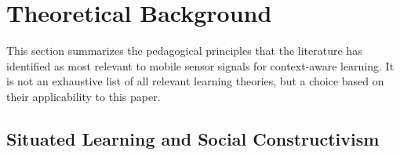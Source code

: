 \documentclass[runningheads]{llncs}
\begin{document}
\section{Theoretical Background}

This section summarizes the pedagogical principles that the literature has identified as most relevant to mobile sensor signals for context-aware learning. It is not an exhaustive list of all relevant learning theories, but a choice based on their applicability to this paper.

\subsection{Situated Learning and Social Constructivism}
\end{document}
